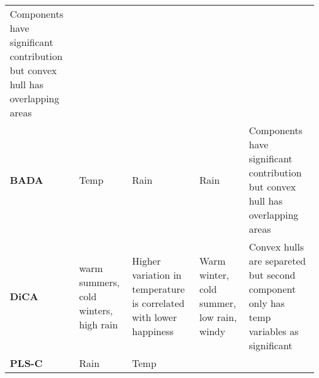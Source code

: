\documentclass[]{book}
\begin{document}
\begin{longtable}[]{@{}lllll@{}}
\begin{minipage}[t]{0.10\columnwidth}
Components have significant contribution but convex hull has overlapping
areas\strut
\end{minipage}\tabularnewline
\begin{minipage}[t]{0.15\columnwidth}\raggedright
\textbf{BADA}\strut
\end{minipage} & \begin{minipage}[t]{0.20\columnwidth}\raggedright
Temp\strut
\end{minipage} & \begin{minipage}[t]{0.19\columnwidth}\raggedright
Rain\strut
\end{minipage} & \begin{minipage}[t]{0.22\columnwidth}\raggedright
Rain\strut
\end{minipage} & \begin{minipage}[t]{0.10\columnwidth}\raggedright
Components have significant contribution but convex hull has overlapping
areas\strut
\end{minipage}\tabularnewline
\begin{minipage}[t]{0.15\columnwidth}\raggedright
\textbf{DiCA}\strut
\end{minipage} & \begin{minipage}[t]{0.20\columnwidth}\raggedright
warm summers, cold winters, high rain\strut
\end{minipage} & \begin{minipage}[t]{0.19\columnwidth}\raggedright
Higher variation in temperature is correlated with lower happiness\strut
\end{minipage} & \begin{minipage}[t]{0.22\columnwidth}\raggedright
Warm winter, cold summer, low rain, windy\strut
\end{minipage} & \begin{minipage}[t]{0.10\columnwidth}\raggedright
Convex hulls are separeted but second component only has temp variables
as significant\strut
\end{minipage}\tabularnewline
\begin{minipage}[t]{0.15\columnwidth}\raggedright
\textbf{PLS-C}\strut
\end{minipage} & \begin{minipage}[t]{0.20\columnwidth}\raggedright
Rain\strut
\end{minipage} & \begin{minipage}[t]{0.19\columnwidth}\raggedright
Temp\strut
\end{minipage} & \begin{minipage}[t]{0.22\columnwidth}\raggedright

\end{minipage}
\end{longtable}
\end{document}
